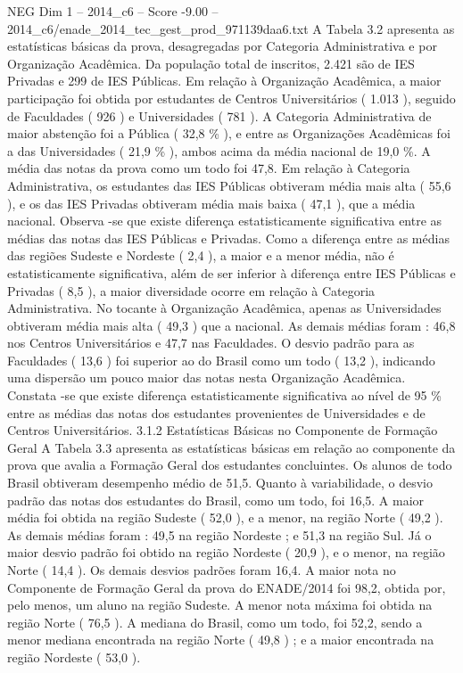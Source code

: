 \begin{textsample}{NEG Dim 1 – 2014\_c6 – Score -9.00 – 2014\_c6/enade\_2014\_tec\_gest\_prod\_971139daa6.txt}
A Tabela 3.2 apresenta as estatísticas básicas da prova, desagregadas por Categoria Administrativa e por Organização Acadêmica.
Da população total de inscritos, 2.421 são de IES Privadas e 299 de IES Públicas.
Em relação à Organização Acadêmica, a maior participação foi obtida por estudantes de Centros Universitários ( 1.013 ), seguido de Faculdades ( 926 ) e Universidades ( 781 ).
A Categoria Administrativa de maior abstenção foi a Pública ( 32,8 \% ), e entre as Organizações Acadêmicas foi a das Universidades ( 21,9 \% ), ambos acima da média nacional de 19,0 \%.
A média das notas da prova como um todo foi 47,8.
Em relação à Categoria Administrativa, os estudantes das IES Públicas obtiveram média mais alta ( 55,6 ), e os das IES Privadas obtiveram média mais baixa ( 47,1 ), que a média nacional.
Observa -se que existe diferença estatisticamente significativa entre as médias das notas das IES Públicas e Privadas.
Como a diferença entre as médias das regiões Sudeste e Nordeste ( 2,4 ), a maior e a menor média, não é estatisticamente significativa, além de ser inferior à diferença entre IES Públicas e Privadas ( 8,5 ), a maior diversidade ocorre em relação à Categoria Administrativa.
No tocante à Organização Acadêmica, apenas as Universidades obtiveram média mais alta ( 49,3 ) que a nacional.
As demais médias foram : 46,8 nos Centros Universitários e 47,7 nas Faculdades.
O desvio padrão para as Faculdades ( 13,6 ) foi superior ao do Brasil como um todo ( 13,2 ), indicando uma dispersão um pouco maior das notas nesta Organização Acadêmica.
Constata -se que existe diferença estatisticamente significativa ao nível de 95 \% entre as médias das notas dos estudantes provenientes de Universidades e de Centros Universitários. 3.1.2 Estatísticas Básicas no Componente de Formação Geral A Tabela 3.3 apresenta as estatísticas básicas em relação ao componente da prova que avalia a Formação Geral dos estudantes concluintes.
Os alunos de todo Brasil obtiveram desempenho médio de 51,5.
Quanto à variabilidade, o desvio padrão das notas dos estudantes do Brasil, como um todo, foi 16,5.
A maior média foi obtida na região Sudeste ( 52,0 ), e a menor, na região Norte ( 49,2 ).
As demais médias foram : 49,5 na região Nordeste ; e 51,3 na região Sul.
Já o maior desvio padrão foi obtido na região Nordeste ( 20,9 ), e o menor, na região Norte ( 14,4 ).
Os demais desvios padrões foram 16,4.
A maior nota no Componente de Formação Geral da prova do ENADE/2014 foi 98,2, obtida por, pelo menos, um aluno na região Sudeste.
A menor nota máxima foi obtida na região Norte ( 76,5 ).
A mediana do Brasil, como um todo, foi 52,2, sendo a menor mediana encontrada na região Norte ( 49,8 ) ; e a maior encontrada na região Nordeste ( 53,0 ).

\end{textsample}
